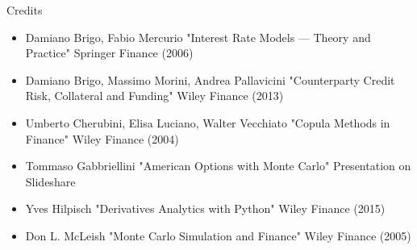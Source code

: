 \documentclass[11pt]{beamer}
\begin{document}
\begin{frame}{Credits}
\begin{itemize}
\item Damiano Brigo, Fabio Mercurio "Interest Rate Models — Theory and Practice" Springer Finance (2006)
\item Damiano Brigo, Massimo Morini, Andrea Pallavicini "Counterparty Credit Risk, Collateral and Funding" Wiley Finance (2013)
\item Umberto Cherubini, Elisa Luciano, Walter Vecchiato "Copula Methods in Finance" Wiley Finance (2004)
\item Tommaso Gabbriellini "American Options with Monte Carlo" Presentation on Slideshare
\item Yves Hilpisch "Derivatives Analytics with Python" Wiley Finance (2015) 
\item Don L. McLeish "Monte Carlo Simulation and Finance" Wiley Finance (2005)
\end{itemize}
\end{frame}
\end{document}
